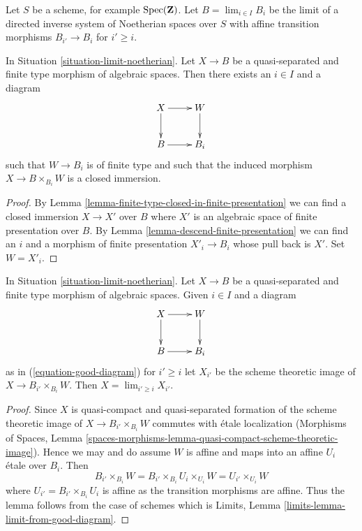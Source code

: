 \begin{situation}
\label{situation-limit-noetherian}
Let $S$ be a scheme, for example $\mathop{\mathrm{Spec}}(\mathbf{Z})$.
Let $B = \lim_{i \in I} B_i$ be the limit
of a directed inverse system of Noetherian spaces over $S$
with affine transition morphisms
$B_{i'} \to B_i$ for $i' \geq i$.
\end{situation}

\begin{lemma}
\label{lemma-good-diagram}
In Situation \ref{situation-limit-noetherian}.
Let $X \to B$ be a quasi-separated and finite type
morphism of algebraic spaces.
Then there exists an $i \in I$ and a diagram
\begin{equation}
\label{equation-good-diagram}
\vcenter{
\xymatrix{
X \ar[r] \ar[d] & W \ar[d] \\
B \ar[r] & B_i
}
}
\end{equation}
such that $W \to B_i$ is of finite type and such that
the induced morphism $X \to B \times_{B_i} W$ is a closed
immersion.
\end{lemma}

\begin{proof}
By Lemma \ref{lemma-finite-type-closed-in-finite-presentation}
we can find a closed immersion $X \to X'$
over $B$ where $X'$ is an algebraic space of finite presentation over $B$.
By Lemma \ref{lemma-descend-finite-presentation}
we can find an $i$ and a morphism of finite presentation
$X'_i \to B_i$ whose pull back is $X'$. Set $W = X'_i$.
\end{proof}

\begin{lemma}
\label{lemma-limit-from-good-diagram}
In Situation \ref{situation-limit-noetherian}.
Let $X \to B$ be a quasi-separated and finite type morphism
of algebraic spaces. Given $i \in I$ and a diagram
$$
\vcenter{
\xymatrix{
X \ar[r] \ar[d] & W \ar[d] \\
B \ar[r] & B_i
}
}
$$
as in (\ref{equation-good-diagram}) for $i' \geq i$ let
$X_{i'}$ be the scheme theoretic image of $X \to B_{i'} \times_{B_i} W$.
Then $X = \lim_{i' \geq i} X_{i'}$.
\end{lemma}

\begin{proof}
Since $X$ is quasi-compact and quasi-separated formation of the
scheme theoretic image of $X \to B_{i'} \times_{B_i} W$
commutes with \'etale localization
(Morphisms of Spaces, Lemma
\ref{spaces-morphisms-lemma-quasi-compact-scheme-theoretic-image}).
Hence we may and do assume $W$ is affine and maps into an affine
$U_i$ \'etale over $B_i$. Then
$$
B_{i'} \times_{B_i} W =
B_{i'} \times_{B_i} U_i \times_{U_i} W =
U_{i'} \times_{U_i} W
$$
where $U_{i'} = B_{i'} \times_{B_i} U_i$ is affine as the transition
morphisms are affine. Thus the lemma follows from the case of schemes
which is
Limits, Lemma \ref{limits-lemma-limit-from-good-diagram}.
\end{proof}

